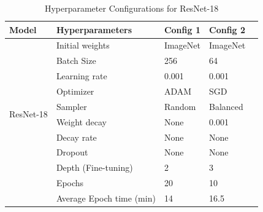 \documentclass[
11pt, %
english, %
singlespacing, %
headsepline, %
]{project_structure}
\begin{document}
\begin{table}[htbp]
\centering
\label{tab:resnet_hyperparameters_1}
\begin{tabular}{@{}lllll@{}}
\toprule
\textbf{Model} & \textbf{Hyperparameters} & \textbf{\acrshort{Config} 1} & \textbf{\acrshort{Config} 2} \\
\midrule
 \multirow{10}{*}{\acrshort{ResNet}-18} &
 \multicolumn{1}{l}{Initial weights} & \multicolumn{1}{l}{ImageNet} & \multicolumn{1}{l}{ImageNet} \\
 & \multicolumn{1}{l}{Batch Size} & \multicolumn{1}{l}{256} & \multicolumn{1}{l}{64} \\
 & \multicolumn{1}{l}{Learning rate} & \multicolumn{1}{l}{0.001} & \multicolumn{1}{l}{0.001} \\
 & \multicolumn{1}{l}{Optimizer} & \multicolumn{1}{l}{ADAM} & \multicolumn{1}{l}{SGD} \\
 & \multicolumn{1}{l}{Sampler} & \multicolumn{1}{l}{Random} & \multicolumn{1}{l}{Balanced} \\
 & \multicolumn{1}{l}{Weight decay} & \multicolumn{1}{l}{None} & \multicolumn{1}{l}{0.001} \\
 & \multicolumn{1}{l}{Decay rate} & \multicolumn{1}{l}{None} & \multicolumn{1}{l}{None} \\
 & \multicolumn{1}{l}{Dropout} & \multicolumn{1}{l}{None} & \multicolumn{1}{l}{None} \\
 & \multicolumn{1}{l}{Depth (Fine-tuning)} & \multicolumn{1}{l}{2} & \multicolumn{1}{l}{3} \\
 & \multicolumn{1}{l}{Epochs} & \multicolumn{1}{l}{20} & \multicolumn{1}{l}{10} \\
                                 
\midrule
& \multicolumn{1}{l}{Average Epoch time (\acrshort{min})} & \multicolumn{1}{l}{14} & \multicolumn{1}{l}{16.5} \\
\bottomrule
\end{tabular}
\caption{Hyperparameter Configurations for \acrshort{ResNet}-18}
\label{tab:resnet18_configs}
\end{table}

\newpage

\end{document}
